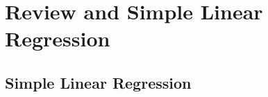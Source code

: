 \documentclass[11pt,fleqn]{book} %
\begin{document}


\pagestyle{empty} %

\tableofcontents %

\cleardoublepage %

\pagestyle{fancy} %





\chapter{Review and Simple Linear Regression}

\section{Simple Linear Regression}
\end{document}
